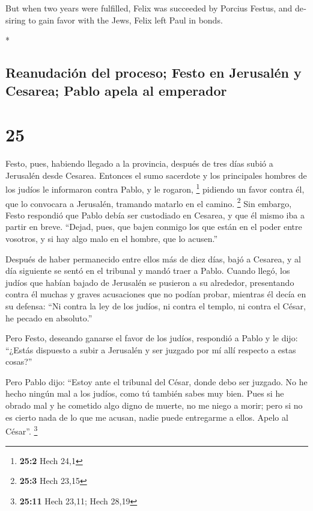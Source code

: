 \begin{paracol}{2}
\begin{otherlanguage}{english}
 But when two years were fulfilled, Felix was succeeded
by Porcius Festus, and desiring to gain favor with the Jews, Felix left
Paul in bonds.

\end{otherlanguage}

\switchcolumn[0]*

\hypertarget{reanudaciuxf3n-del-proceso-festo-en-jerusaluxe9n-y-cesarea-pablo-apela-al-emperador}{%
\subsection{Reanudación del proceso; Festo en Jerusalén y Cesarea; Pablo
apela al
emperador}\label{reanudaciuxf3n-del-proceso-festo-en-jerusaluxe9n-y-cesarea-pablo-apela-al-emperador}}

\hypertarget{section-48}{%
\section{25}\label{section-48}}

 Festo, pues, habiendo llegado a la provincia, después de
tres días subió a Jerusalén desde Cesarea.  Entonces el
sumo sacerdote y los principales hombres de los judíos le informaron
contra Pablo, y le rogaron, \footnote{\textbf{25:2} Hech 24,1}
 pidiendo un favor contra él, que lo convocara a
Jerusalén, tramando matarlo en el camino. \footnote{\textbf{25:3} Hech
  23,15}  Sin embargo, Festo respondió que Pablo debía ser
custodiado en Cesarea, y que él mismo iba a partir en breve.
 ``Dejad, pues, que bajen conmigo los que están en el
poder entre vosotros, y si hay algo malo en el hombre, que lo acusen.''

 Después de haber permanecido entre ellos más de diez
días, bajó a Cesarea, y al día siguiente se sentó en el tribunal y mandó
traer a Pablo.  Cuando llegó, los judíos que habían bajado
de Jerusalén se pusieron a su alrededor, presentando contra él muchas y
graves acusaciones que no podían probar,  mientras él
decía en su defensa: ``Ni contra la ley de los judíos, ni contra el
templo, ni contra el César, he pecado en absoluto.''

 Pero Festo, deseando ganarse el favor de los judíos,
respondió a Pablo y le dijo: ``¿Estás dispuesto a subir a Jerusalén y
ser juzgado por mí allí respecto a estas cosas?''

 Pero Pablo dijo: ``Estoy ante el tribunal del César,
donde debo ser juzgado. No he hecho ningún mal a los judíos, como tú
también sabes muy bien.  Pues si he obrado mal y he
cometido algo digno de muerte, no me niego a morir; pero si no es cierto
nada de lo que me acusan, nadie puede entregarme a ellos. Apelo al
César''. \footnote{\textbf{25:11} Hech 23,11; Hech 28,19}


\end{paracol}
